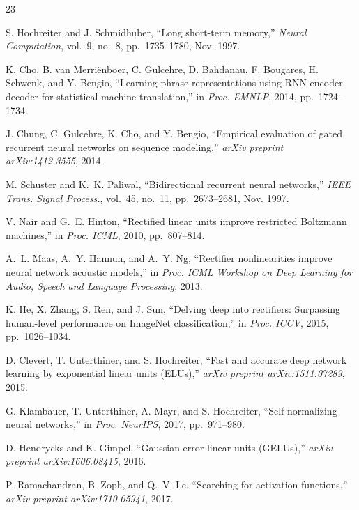 \documentclass[conference,a4paper]{IEEEtran}
\begin{document}
{\footnotesize
\begin{thebibliography}{23}
\setlength{\itemsep}{-2.2pt}


S. Hochreiter and J. Schmidhuber,
``Long short-term memory,''
\textit{Neural Computation}, vol.~9, no.~8, pp.~1735--1780, Nov. 1997.

K. Cho, B. van Merri\"{e}nboer, C. Gulcehre, D. Bahdanau, F. Bougares,
H. Schwenk, and Y. Bengio,
``Learning phrase representations using RNN encoder-decoder for statistical
machine translation,''
in \textit{Proc. EMNLP}, 2014, pp.~1724--1734.

J. Chung, C. Gulcehre, K. Cho, and Y. Bengio,
``Empirical evaluation of gated recurrent neural networks on sequence
modeling,''
\textit{arXiv preprint arXiv:1412.3555}, 2014.

M. Schuster and K.~K. Paliwal,
``Bidirectional recurrent neural networks,''
\textit{IEEE Trans. Signal Process.}, vol.~45, no.~11,
pp.~2673--2681, Nov. 1997.


V. Nair and G.~E. Hinton,
``Rectified linear units improve restricted Boltzmann machines,''
in \textit{Proc. ICML}, 2010, pp.~807--814.

A.~L. Maas, A.~Y. Hannun, and A.~Y. Ng,
``Rectifier nonlinearities improve neural network acoustic models,''
in \textit{Proc. ICML Workshop on Deep Learning for Audio, Speech and
Language Processing}, 2013.

K. He, X. Zhang, S. Ren, and J. Sun,
``Delving deep into rectifiers: Surpassing human-level performance on
ImageNet classification,''
in \textit{Proc. ICCV}, 2015, pp.~1026--1034.

D. Clevert, T. Unterthiner, and S. Hochreiter,
``Fast and accurate deep network learning by exponential linear units
(ELUs),''
\textit{arXiv preprint arXiv:1511.07289}, 2015.

G. Klambauer, T. Unterthiner, A. Mayr, and S. Hochreiter,
``Self-normalizing neural networks,''
in \textit{Proc. NeurIPS}, 2017, pp.~971--980.

D. Hendrycks and K. Gimpel,
``Gaussian error linear units (GELUs),''
\textit{arXiv preprint arXiv:1606.08415}, 2016.

P. Ramachandran, B. Zoph, and Q.~V. Le,
``Searching for activation functions,''
\textit{arXiv preprint arXiv:1710.05941}, 2017.


\end{thebibliography}}
\end{document}
